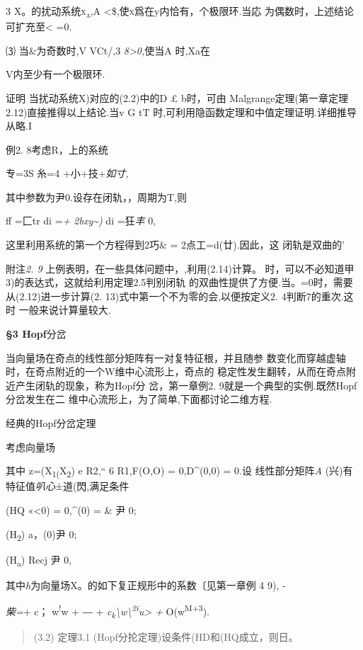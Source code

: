 \documentclass{article}
\begin{document}
3 X。的扰动系统\textsc{x\textsubscript{a},\textbar{}A\textbar{}}
\textless{}\$,使\textsc{x}爲在y内恰有，个极限环.当応
为偶数时，上述结论可扩充至\textless{} =0.

⑶ 当\&为奇数时,V VCt/,3
\emph{8\textgreater{}0,}使当\textbar{}A\textbar{} 时,Xa在

V内至少有一个极限环.

证明 当扰动系统X)对应的(2.2)中的D £ b时，可由
Malgrange定理(第一章定理2.12)直接推得以上结论.当v G tT
时,可利用隐函数定理和中值定理证明.详细推导从略.I

例2. 8考虑R，上的系统

专=3S 糸=4 +小+技+\emph{如寸,}

其中参数为尹0.设存在闭轨，，周期为T,则

ff =匚tr di =\emph{+ 2bxy\textasciitilde{})} di =狂\emph{丰} 0,

这里利用系统的第一个方程得到2巧\& = 2点工=d(廿).因此，这 闭轨是双曲的'

附注\emph{2. 9} 上例表明，在一些具体问题中，,利用(2.14)计算。
时，可以不必知道甲3)的表达式，这就给利用定理2.5判别闭轨
的双曲性提供了方便.当。=0时，需要从(2.12)进一步计算(2.
13)式中第一个不为零的会,以便按定义2. 4判断7的重次.这时
一般来说计算量较大.

\textbf{§3 Hopf}分岔

当向量场在奇点的线性部分矩阵有一对复特征根，并且随参
数变化而穿越虚轴时，在奇点附近的一个W维中心流形上，奇点的
稳定性发生翻转，从而在奇点附近产生闭轨的现象，称为Hopf分 岔，第一章例2.
9就是一个典型的实例.既然Hopf分岔发生在二
维中心流形上，为了简单,下面都讨论二维方程.

经典的Hopf分岔定理

考虑向量场

其中 z=(X\textsubscript{1(}X\textsubscript{2}) e R2,`` 6 R1,F(O,O) =
0,D\^{}(0,0) = 0.设 线性部分矩阵\emph{A}
(兴)有特征值\emph{叭心}±道(閃,满足条件

(HQ «\textless{}0) = 0,\^{}(0) = \& 尹 0;

(H\textsubscript{2}) a，(0)尹 0;

(H\textsubscript{a}) Recj 尹 0,

其中\emph{h}为向量场X。的如下复正规形中的系数〔见第一章例 4 9), -

\emph{柴=}+ c； \textbar{}w\textbar{}\textsuperscript{!}w + ― +
\emph{c\textsubscript{k}\textbackslash{}w\textbackslash{}\textsuperscript{2i}u\textgreater{}
+} O(\textbar{}w\textbar{}\textsuperscript{M+3}).

\begin{quote}
(3.2) 定理3.1 (Hopf分抡定理)设条件(HD和(HQ成立，则日。
\end{quote}
\end{document}
